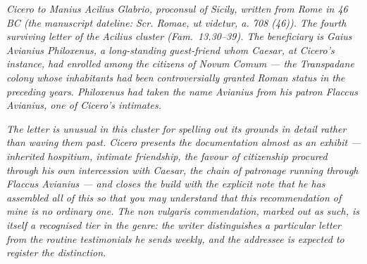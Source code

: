 
\textit{Cicero to Manius Acilius Glabrio, proconsul of
Sicily, written from Rome in 46 BC (the manuscript
dateline: \textit{Scr. Romae, ut videtur, a. 708 (46)}).
The fourth surviving letter of the Acilius cluster
(Fam.\ 13.30--39). The beneficiary is Gaius Avianius
Philoxenus, a long-standing guest-friend whom Caesar, at
Cicero's instance, had enrolled among the citizens of
Novum Comum --- the Transpadane colony whose inhabitants
had been controversially granted Roman status in the
preceding years. Philoxenus had taken the name
\textit{Avianius} from his patron Flaccus Avianius, one
of Cicero's intimates.}

\textit{The letter is unusual in this cluster for
spelling out its grounds in detail rather than waving
them past. Cicero presents the documentation almost as
an exhibit --- inherited hospitium, intimate friendship,
the favour of citizenship procured through his own
intercession with Caesar, the chain of patronage running
through Flaccus Avianius --- and closes the build with
the explicit note that he has assembled all of this
\textit{so that you may understand that this
recommendation of mine is no ordinary one}. The
\textit{non vulgaris} commendation, marked out as such,
is itself a recognised tier in the genre: the writer
distinguishes a particular letter from the routine
testimonials he sends weekly, and the addressee is
expected to register the distinction.}
